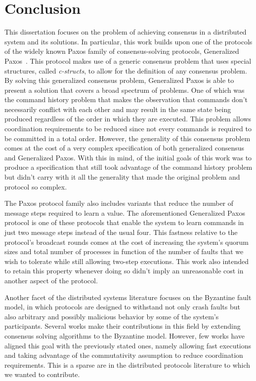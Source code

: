 \chapter{Conclusion} \label{conclusion}
This dissertation focuses on the problem of achieving consensus in a distributed system and its solutions. In particular, this work builds upon one of the protocols of the widely known Paxos family of consensus-solving protocols, Generalized Paxos~\cite{Lamport2005}. This protocol makes use of a generic consensus problem that uses special structures, called \textit{c-structs}, to allow for the definition of any consensus problem. By solving this generalized consensus problem, Generalized Paxos is able to present a solution that covers a broad spectrum of problems. One of which was the command history problem that makes the observation that commands don't necessarily conflict with each other and may result in the same state being produced regardless of the order in which they are executed. This problem allows coordination requirements to be reduced since not every commands is required to be committed in a total order. However, the generality of this consensus problem comes at the cost of a very complex specification of both generalized consensus and Generalized Paxos. With this in mind, of the initial goals of this work was to produce a specification that still took advantage of the command history problem but didn't carry with it all the generality that made the original problem and protocol so complex. \par
The Paxos protocol family also includes variants that reduce the number of message steps required to learn a value. The aforementioned Generalized Paxos protocol is one of these protocols that enable the system to learn commands in just two message steps instead of the usual four. This fastness relative to the protocol's broadcast rounds comes at the cost of increasing the system's quorum sizes and total number of processes in function of the number of faults that we wish to tolerate while still allowing two-step executions. This work also intended to retain this property whenever doing so didn't imply an unreasonable cost in another aspect of the protocol. \par
Another facet of the distributed systems literature focuses on the Byzantine fault model, in which protocols are designed to withstand not only crash faults but also arbitrary and possibly malicious behavior by some of the system's participants. Several works make their contributions in this field by extending consensus solving algorithms to the Byzantine model. However, few works have aligned this goal with the previously stated ones, namely allowing fast executions and taking advantage of the commutativity assumption to reduce coordination requirements. This is a sparse are in the distributed protocols literature to which we wanted to contribute.\par
